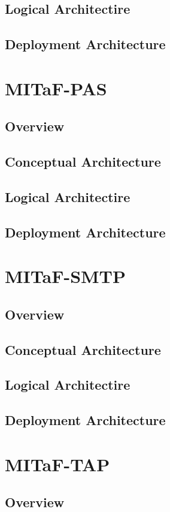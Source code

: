 \documentclass[a4paper]{book}
\begin{document}
\section{Logical Architectire}
\section{Deployment Architecture}

\chapter{MITaF-PAS}
\section{Overview}
\section{Conceptual Architecture}
\section{Logical Architectire}
\section{Deployment Architecture}

\chapter{MITaF-SMTP}
\section{Overview}
\section{Conceptual Architecture}
\section{Logical Architectire}
\section{Deployment Architecture}

\chapter{MITaF-TAP}
\section{Overview}
\end{document}
